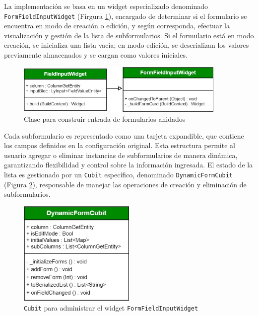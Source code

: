 \documentclass{article}
\begin{document}
La implementación se basa en un widget especializado denominado \texttt{FormFieldInputWidget} (Firgura \ref{fig:forminput}), encargado de determinar si el formulario se encuentra en modo de creación o edición, y según corresponda, efectuar la visualización y gestión de la lista de subformularios. Si el formulario está en modo creación, se inicializa una lista vacía; en modo edición, se deserializan los valores previamente almacenados y se cargan como valores iniciales.

\begin{figure}[H]
  \centering
  \includegraphics[width=0.9\textwidth]{images/form_field_input.jpg}
  \caption{Clase para construir entrada de formularios anidados}
  \label{fig:forminput}
\end{figure}

Cada subformulario es representado como una tarjeta expandible, que contiene los campos definidos en la configuración original. Esta estructura permite al usuario agregar o eliminar instancias de subformularios de manera dinámica, garantizando flexibilidad y control sobre la información ingresada. El estado de la lista es gestionado por un \texttt{Cubit} específico, denominado \texttt{DynamicFormCubit} (Figura \ref{fig:dynamicformlist}), responsable de manejar las operaciones de creación y eliminación de subformularios.

\begin{figure}[H]
  \centering
  \includegraphics[width=0.5\textwidth]{images/dynamic_form_list.jpg}
  \caption{\texttt{Cubit} para administrar el widget \texttt{FormFieldInputWidget}}
  \label{fig:dynamicformlist}
\end{figure}
\end{document}
